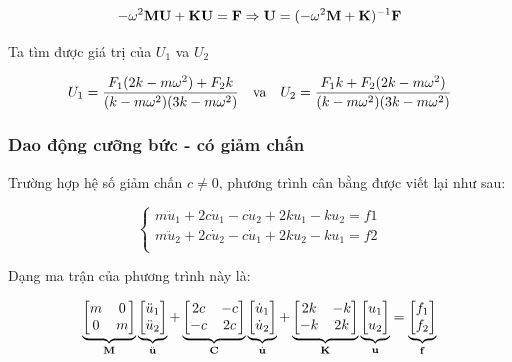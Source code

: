 \begin{equation}
    -\omega^2{\bf M}{\bf U} + {\bf K}{\bf U} = {\bf F} \Rightarrow {\bf U} = (-\omega^2{\bf M}+{\bf K})^{-1} {\bf F}
\end{equation}

Ta tìm được giá trị của $U_1$ va $U_2$

\begin{equation}
    U_1 = \frac{F_1(2k-m\omega^2)+F_2k}{(k-m\omega^2)(3k-m\omega^2)} \quad \hbox{va} \quad U_2 = \frac{F_1k+F_2(2k-m\omega^2)}{(k-m\omega^2)(3k-m\omega^2)}
\end{equation}

\subsubsection{Dao động cưỡng bức - có giảm chấn}

Trường hợp hệ số giảm chấn  $c \neq 0$, phương trình cân bằng được viết lại như sau:

\begin{equation}\label{eq_PT2dofs_c}
    \begin{cases}
        m \ddot{u}_1 + 2c\dot{u}_1 - c\dot{u}_2 + 2ku_1 - ku_2 = f1 \\
        m \ddot{u}_2 + 2c\dot{u}_2 - c\dot{u}_1 + 2ku_2 - ku_1 = f2 \\
    \end{cases}
\end{equation}

Dạng ma trận của phương trình này là:

\begin{equation}\label{eq_PT2dofs_c_matrix}
    \underbrace{\begin{bmatrix}
        m & 0\\ 0 & m
    \end{bmatrix}}_{\bf M}\underbrace{\begin{bmatrix}
        \ddot{u}_1 \\ \ddot{u}_2
    \end{bmatrix}}_{\ddot{\bf u}} + \underbrace{\begin{bmatrix}
        2c & -c \\ -c & 2c
    \end{bmatrix}}_{\bf C}\underbrace{\begin{bmatrix}
        \dot{u}_1 \\ \dot{u}_2
    \end{bmatrix}}_{\dot{\bf u}} +\underbrace{\begin{bmatrix}
        2k & -k \\ -k & 2k
    \end{bmatrix}}_{\bf K} \underbrace{\begin{bmatrix}
        u_1 \\ u_2
    \end{bmatrix}}_{\bf u} = \underbrace{\begin{bmatrix}
        f_1 \\ f_2
    \end{bmatrix}}_{\bf f} 
\end{equation}

